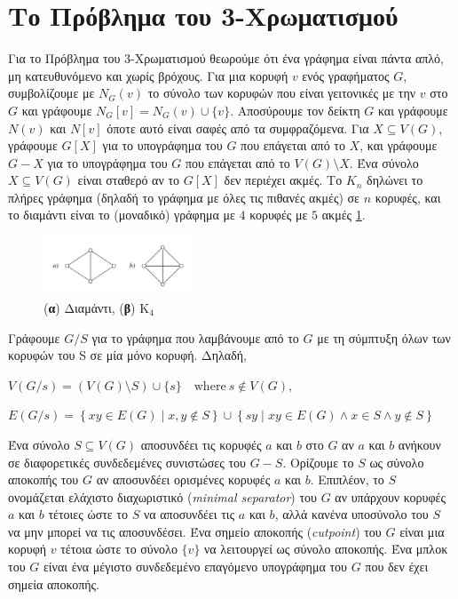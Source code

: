 \section{Το Πρόβλημα του 3-Χρωματισμού}
\label{sec:3-Coloring_Alg}


Για το Πρόβλημα του 3-Χρωματισμού θεωρούμε ότι ένα γράφημα είναι πάντα απλό, μη κατευθυνόμενο και χωρίς βρόχους. Για μια κορυφή $v$ ενός γραφήματος $G$, συμβολίζουμε με $N_G(v)$ το σύνολο των κορυφών που είναι γειτονικές με την $v$ στο $G$ και γράφουμε $N_G[v] = N_G(v) \cup \{v\}$. Αποσύρουμε τον δείκτη $G$ και γράφουμε $N(v)$ και $N[v]$ όποτε αυτό είναι σαφές από τα συμφραζόμενα. Για $X \subseteq V(G)$, γράφουμε $G[X]$ για το υπογράφημα του $G$ που επάγεται από το $X$, και γράφουμε $G - X$ για το υπογράφημα του $G$ που επάγεται από το $V(G) \setminus X$. Ένα σύνολο $X \subseteq V(G)$ είναι σταθερό αν το $G[X]$ δεν περιέχει ακμές. Το $K_n$ δηλώνει το πλήρες γράφημα (δηλαδή το γράφημα με όλες τις πιθανές ακμές) σε $n$ κορυφές, και το διαμάντι είναι το (μοναδικό) γράφημα με $4$ κορυφές με $5$ ακμές \ref{fig:diamond-k4}.

\begin{figure}[H]
	\centering
	\includegraphics[width=0.4\textwidth]{pictures/diamond-k4.png} 
	\caption{(\textbf{α}) Διαμάντι, (\textbf{β}) $\text{Κ}_{\text{4}}$}
	\label{fig:diamond-k4}
\end{figure}

Γράφουμε $G/S$ για το γράφημα που λαμβάνουμε από το $G$ με τη σύμπτυξη όλων των
κορυφών του S σε μία μόνο κορυφή. Δηλαδή,

$V(G/s)=\left(V(G)\setminus S\right)\cup\{s\}\quad\mathrm{where}\ s\notin V(G),$

$E(G/s)=\left\{x y\in E(G)\mid x,y\notin S\right\}\cup\left\{s y\mid x y\in E(G)\land x\in S\land y\notin S\right\}$


Ένα σύνολο $S \subseteq V(G)$ αποσυνδέει τις κορυφές $a$ και $b$ στο $G$ αν $a$ και $b$ ανήκουν σε διαφορετικές συνδεδεμένες συνιστώσες του $G - S$. Ορίζουμε το $S$ ως σύνολο αποκοπής του $G$ αν αποσυνδέει ορισμένες κορυφές $a$ και $b$. Επιπλέον, το $S$ ονομάζεται ελάχιστο διαχωριστικό (\textit{minimal separator}) του $G$ αν υπάρχουν κορυφές $a$ και $b$ τέτοιες ώστε το $S$ να αποσυνδέει τις $a$ και $b$, αλλά κανένα υποσύνολο του $S$ να μην μπορεί να τις αποσυνδέσει. Ένα σημείο αποκοπής (\textit{cutpoint}) του $G$ είναι μια κορυφή $v$ τέτοια ώστε το σύνολο $\{v\}$ να λειτουργεί ως σύνολο αποκοπής. Ένα μπλοκ του $G$ είναι ένα μέγιστο συνδεδεμένο επαγόμενο
υπογράφημα του $G$ που δεν έχει σημεία αποκοπής.

